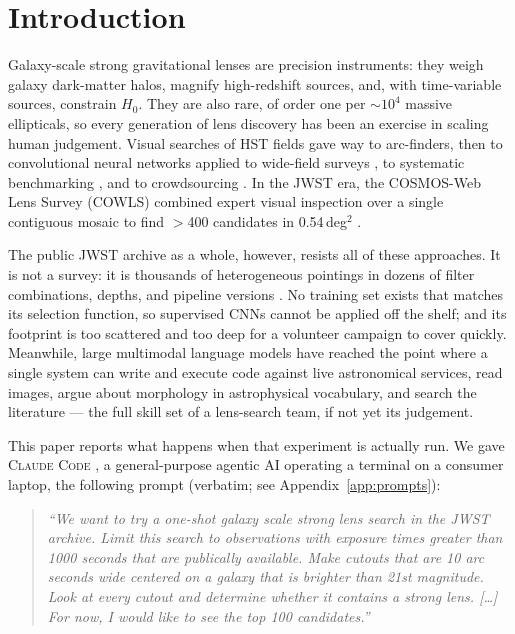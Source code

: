 \documentclass[11pt,letterpaper]{article}
\newcommand{\cc}{\textsc{Claude Code}}
\begin{document}
\tableofcontents

\bigskip

\section{Introduction}\label{sec:intro}

Galaxy-scale strong gravitational lenses are precision instruments: they weigh
galaxy dark-matter halos, magnify high-redshift sources, and, with
time-variable sources, constrain $H_0$. They are also rare, of order one per
$\sim$$10^4$ massive ellipticals, so every generation of lens discovery has
been an exercise in scaling human judgement. Visual searches of HST fields
gave way to arc-finders, then to convolutional neural networks applied to
wide-field surveys \citep{petrillo2017finding, jacobs2019extended,
huang2020finding, huang2021discovering, storfer2024new, inchausti2025strong},
to systematic benchmarking \citep{metcalf2019strong}, and to crowdsourcing
\citep{marshall2016spacewarps, garvin2022hubble}. In the JWST era, the
COSMOS-Web Lens Survey (COWLS) combined expert visual inspection over a single
contiguous mosaic to find $>$400 candidates in 0.54\,deg$^2$
\citep{nightingale2025cowls1, mahler2025cowls2}.

The public JWST archive as a whole, however, resists all of these approaches.
It is not a survey: it is thousands of heterogeneous pointings in dozens of
filter combinations, depths, and pipeline versions
\citep{gardner2023jwst, rieke2023nircam}. No training set exists that matches
its selection function, so supervised CNNs cannot be applied off the shelf;
and its footprint is too scattered and too deep for a volunteer campaign to
cover quickly. Meanwhile, large multimodal language models have reached the
point where a single system can write and execute code against live
astronomical services, read images, argue about morphology in astrophysical
vocabulary, and search the literature --- the full skill set of a lens-search
team, if not yet its judgement.

This paper reports what happens when that experiment is actually run. We gave
\cc{} \citep{anthropic2025claudecode}, a general-purpose agentic AI operating a
terminal on a consumer laptop, the following prompt (verbatim; see
Appendix~\ref{app:prompts}):

\begin{quote}\itshape
``We want to try a one-shot galaxy scale strong lens search in the JWST
archive. Limit this search to observations with exposure times greater than
1000 seconds that are publically available. Make cutouts that are 10 arc
seconds wide centered on a galaxy that is brighter than 21st magnitude. Look
at every cutout and determine whether it contains a strong lens. [\ldots] For
now, I would like to see the top 100 candidates.''
\end{quote}
\end{document}

